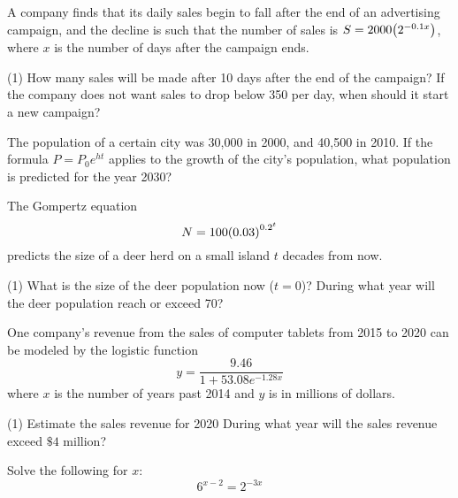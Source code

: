 \documentclass[../mathNotesPreamble]{subfiles}
\begin{document}
    \begin{ex*}
      A company finds that its daily sales begin to fall after the end of an advertising campaign, and the decline is such that the number of sales is $S=2000{\left(2^{-0.1x}\right)}$, where $x$ is the number of days after the campaign ends.
    \end{ex*}
    \begin{extasks}[after-item-skip=\stretch{0.5}](1)
      \task How many sales will be made after 10 days after the end of the campaign?
      \task If the company does not want sales to drop below 350 per day, when should it start a new campaign?
    \end{extasks}
    \pagebreak


    \begin{ex*}
      The population of a certain city was 30,000 in 2000, and 40,500 in 2010. If the formula $P=P_0e^{ht}$ applies to the growth of the city's population, what population is predicted for the year 2030?
    \end{ex*}
    \pagebreak

    \begin{ex*}
      The Gompertz equation
        \[N=100{\left(0.03\right)}^{0.2^t}\]
      predicts the size of a deer herd on a small island $t$ decades from now.
    \end{ex*}
    \begin{extasks}[after-item-skip=4\baselineskip](1)
      \task What is the size of the deer population now ($t=0$)?
      \task During what year will the deer population reach or exceed 70?
    \end{extasks}
    \pagebreak

    \begin{ex*}
      One company's revenue from the sales of computer tablets from 2015 to 2020 can be modeled by the logistic function
        \[y=\frac{9.46}{1+53.08e^{-1.28x}}\]
      where $x$ is the number of years past 2014 and $y$ is in millions of dollars.
    \end{ex*}
    \begin{extasks}[after-item-skip=\stretch{0.25}](1)
      \task Estimate the sales revenue for 2020
      \task During what year will the sales revenue exceed $\$4$ million?
    \end{extasks}
    \pagebreak

    \begin{ex*}[Bonus]
      Solve the following for $x$:
        \[6^{x-2}=2^{-3x}\]
    \end{ex*}

  \pagebreak
\end{document}
